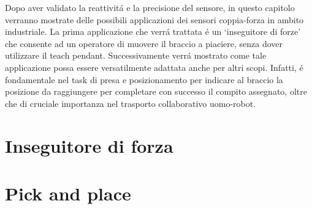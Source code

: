 Dopo aver validato la reattivit\'{a} e la precisione del sensore, in questo capitolo verranno mostrate delle possibili applicazioni 
dei sensori coppia-forza in ambito industriale. 
La prima applicazione che verr\'{a} trattata \'{e} un `inseguitore di forze' che consente ad un operatore di muovere il braccio 
a piaciere, senza dover utilizzare 
il teach pendant. Successivamente verr\'{a} mostrato come tale applicazione possa essere versatilmente adattata anche per altri scopi. 
Infatti, \'{e} fondamentale nel task di presa e posizionamento per indicare al braccio la posizione da raggiungere per completare 
con successo il compito assegnato, oltre che di cruciale importanza nel trasporto collaborativo uomo-robot. 

\section{Inseguitore di forza}


\section{Pick and place}

